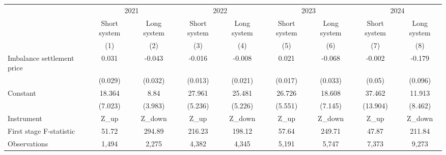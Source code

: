 \begingroup
\setlength{}
\setlength{}\fontsize{9.0pt}{10.8pt}\selectfont
\begin{longtable}{@{\extracolsep{\fill}}lcccccccc}
\toprule
 & \multicolumn{2}{c}{2021} & \multicolumn{2}{c}{2022} & \multicolumn{2}{c}{2023} & \multicolumn{2}{c}{2024} \\ 
\cmidrule(lr){2-3} \cmidrule(lr){4-5} \cmidrule(lr){6-7} \cmidrule(lr){8-9}
 & Short system & Long system & Short system & Long system & Short system & Long system & Short system & Long system \\ 
\cmidrule(lr){2-2} \cmidrule(lr){3-3} \cmidrule(lr){4-4} \cmidrule(lr){5-5} \cmidrule(lr){6-6} \cmidrule(lr){7-7} \cmidrule(lr){8-8} \cmidrule(lr){9-9}
  & (1) & (2) & (3) & (4) & (5) & (6) & (7) & (8) \\ 
\midrule\addlinespace[2.5pt]
Imbalance settlement price & 0.031 & -0.043 & -0.016 & -0.008 & 0.021 & -0.068 & -0.002 & -0.179 \\ 
 & (0.029) & (0.032) & (0.013) & (0.021) & (0.017) & (0.033) & (0.05) & (0.096) \\ 
Constant & 18.364 & 8.84 & 27.961 & 25.481 & 26.726 & 18.608 & 37.462 & 11.913 \\ 
{} & {(7.023)} & {(3.983)} & {(5.236)} & {(5.226)} & {(5.551)} & {(7.145)} & {(13.904)} & {(8.462)} \\ 
Instrument & Z\_up & Z\_down & Z\_up & Z\_down & Z\_up & Z\_down & Z\_up & Z\_down \\ 
First stage F-statistic & 51.72 & 294.89 & 216.23 & 198.12 & 57.64 & 249.71 & 47.87 & 211.84 \\ 
Observations & 1,494 & 2,275 & 4,382 & 4,345 & 5,191 & 5,747 & 7,373 & 9,273 \\ 
\bottomrule
\end{longtable}
\endgroup

